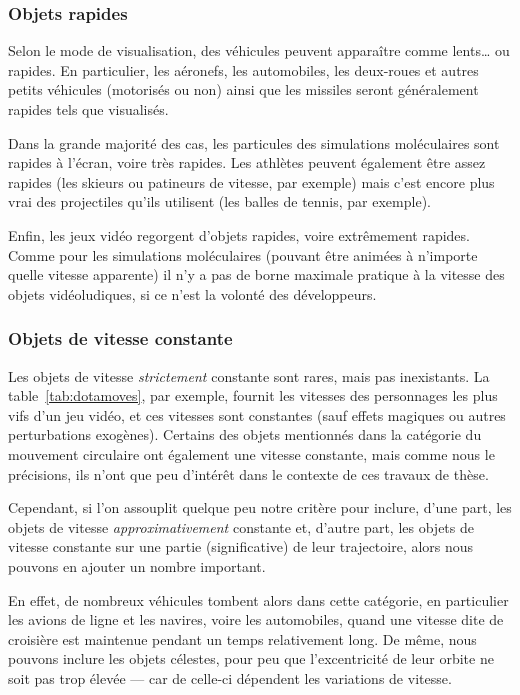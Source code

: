	\subsubsection{Objets rapides}
	Selon le mode de visualisation, des véhicules peuvent apparaître comme lents\ldots{} ou rapides. En particulier, les aéronefs, les automobiles, les deux-roues et autres petits véhicules (motorisés ou non) ainsi que les missiles seront généralement rapides tels que visualisés.
	
	Dans la grande majorité des cas, les particules des simulations moléculaires sont rapides à l'écran, voire très rapides. Les athlètes peuvent également être assez rapides (les skieurs ou patineurs de vitesse, par exemple) mais c'est encore plus vrai des projectiles qu'ils utilisent (les balles de tennis, par exemple).
	
	Enfin, les jeux vidéo regorgent d'objets rapides, voire extrêmement rapides. Comme pour les simulations moléculaires (pouvant être animées à n'importe quelle vitesse apparente) il n'y a pas de borne maximale pratique à la vitesse des objets vidéoludiques, si ce n'est la volonté des développeurs.
	
	\subsubsection{Objets de vitesse constante}
	Les objets de vitesse \emph{strictement} constante sont rares, mais pas inexistants. La table~\ref{tab:dotamoves}, par exemple, fournit les vitesses des personnages les plus vifs d'un jeu vidéo, et ces vitesses sont constantes (sauf effets magiques ou autres perturbations exogènes). Certains des objets mentionnés dans la catégorie du mouvement circulaire ont également une vitesse constante, mais comme nous le précisions, ils n'ont que peu d'intérêt dans le contexte de ces travaux de thèse.
	
	Cependant, si l'on assouplit quelque peu notre critère pour inclure, d'une part, les objets de vitesse \emph{approximativement} constante et, d'autre part, les objets de vitesse constante sur une partie (significative) de leur trajectoire, alors nous pouvons en ajouter un nombre important.
	
	En effet, de nombreux véhicules tombent alors dans cette catégorie, en particulier les avions de ligne et les navires, voire les automobiles, quand une vitesse dite de croisière est maintenue pendant un temps relativement long. De même, nous pouvons inclure les objets célestes, pour peu que l'excentricité de leur orbite ne soit pas trop élevée --- car de celle-ci dépendent les variations de vitesse.
	
